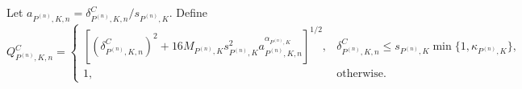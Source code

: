 Let \(a_{P^{(n)},K,n}=\delta^C_{P^{(n)},K,n}/s_{P^{(n)},K}\).  Define
\[
 Q^C_{P^{(n)},K,n}=
 \begin{cases}
 [(\delta^C_{P^{(n)},K,n})^2+16M_{P^{(n)},K}s_{P^{(n)},K}^2
 a_{P^{(n)},K,n}^{\alpha_{P^{(n)},K}}]^{1/2},
 &\delta^C_{P^{(n)},K,n}\leq s_{P^{(n)},K}\min\{1,\kappa_{P^{(n)},K}\},\\
 1,&\text{otherwise}.
 \end{cases}
\]